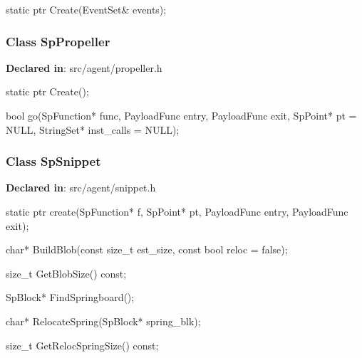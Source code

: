 \begin{apient}
static ptr Create(EventSet& events);
\end{apient}

\subsubsection{Class SpPropeller}
\textbf{Declared in}: src/agent/propeller.h

\begin{apient}
static ptr Create();
\end{apient}

\begin{apient}
bool go(SpFunction* func,
        PayloadFunc entry,
        PayloadFunc exit,
        SpPoint* pt = NULL,
        StringSet* inst_calls = NULL);
\end{apient}
\apidesc{
}

\subsubsection{Class SpSnippet}
\textbf{Declared in}: src/agent/snippet.h

\begin{apient}
static ptr create(SpFunction* f,
                  SpPoint* pt,
                  PayloadFunc entry,
                  PayloadFunc exit);
\end{apient}
\apidesc{
}

\begin{apient}
char* BuildBlob(const size_t est_size,
                const bool reloc = false);
\end{apient}
\apidesc{
}

\begin{apient}
size_t GetBlobSize() const;
\end{apient}
\apidesc{
}

\begin{apient}
SpBlock* FindSpringboard();
\end{apient}
\apidesc{
}

\begin{apient}
char* RelocateSpring(SpBlock* spring_blk);
\end{apient}
\apidesc{
}

\begin{apient}
size_t GetRelocSpringSize() const;
\end{apient}
\apidesc{
}

